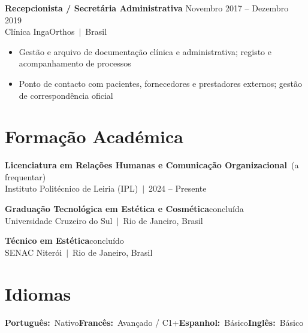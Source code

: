 \documentclass[10pt,a4paper]{article}
\begin{document}
\vspace{3pt}
{\small\bfseries Recepcionista / Secretária Administrativa}\hfill{\small\color{subtle} Novembro 2017 -- Dezembro 2019}\\
{\small\color{accent} Clínica IngaOrthos~$|$~Brasil}
\begin{itemize}\small
  \item Gestão e arquivo de documentação clínica e administrativa; registo e acompanhamento de processos
  \item Ponto de contacto com pacientes, fornecedores e prestadores externos; gestão de correspondência oficial
\end{itemize}

\section{Formação Académica}

{\small\bfseries Licenciatura em Relações Humanas e Comunicação Organizacional}~{\small\color{subtle}(a frequentar)}\\
{\small Instituto Politécnico de Leiria (IPL)~$|$~2024 -- Presente}

\vspace{3pt}
{\small\bfseries Graduação Tecnológica em Estética e Cosmética}\hfill{\small\color{subtle}concluída}\\
{\small Universidade Cruzeiro do Sul~$|$~Rio de Janeiro, Brasil}

\vspace{3pt}
{\small\bfseries Técnico em Estética}\hfill{\small\color{subtle}concluído}\\
{\small SENAC Niterói~$|$~Rio de Janeiro, Brasil}

\section{Idiomas}
{\small
\textbf{Português:}~Nativo\quad\textbf{Francês:}~Avançado / C1+\quad\textbf{Espanhol:}~Básico\quad\textbf{Inglês:}~Básico
}
\end{document}

